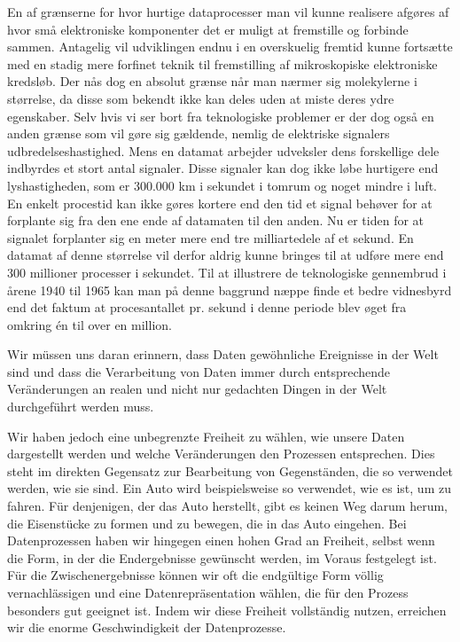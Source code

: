 {En af grænserne for hvor hurtige dataprocesser man vil kunne realisere afgøres af hvor små elektroniske komponenter det er muligt at fremstille og forbinde sammen. Antagelig vil udviklingen endnu i en overskuelig fremtid kunne fortsætte med en stadig mere forfinet teknik til fremstilling af mikroskopiske elektroniske kredsløb. Der nås dog en absolut grænse når man nærmer sig molekylerne i størrelse, da disse som bekendt ikke kan deles uden at miste deres ydre egenskaber. Selv hvis vi ser bort fra teknologiske problemer er der dog også en anden grænse som vil gøre sig gældende, nemlig de elektriske signalers udbredelseshastighed. Mens en datamat arbejder udveksler dens forskellige dele indbyrdes et stort antal signaler. Disse signaler kan dog ikke løbe hurtigere end lyshastigheden, som er 300.000 km i sekundet i tomrum og noget mindre i luft. En enkelt procestid kan ikke gøres kortere end den tid et signal behøver for at forplante sig fra den ene ende af datamaten til den anden. Nu er tiden for at signalet forplanter sig en meter mere end tre milliartedele af et sekund. En datamat af denne størrelse vil derfor aldrig kunne bringes til at udføre mere end 300 millioner processer i sekundet. Til at illustrere de teknologiske gennembrud i årene 1940 til 1965 kan man på denne baggrund næppe finde et bedre vidnesbyrd end det faktum at procesantallet pr. sekund i denne periode blev øget fra omkring én til over en million.
}{
Wir müssen uns daran erinnern, dass Daten gewöhnliche Ereignisse in der Welt sind und dass die Verarbeitung von Daten immer durch entsprechende Veränderungen an realen und nicht nur gedachten Dingen in der Welt durchgeführt werden muss.

Wir haben jedoch eine unbegrenzte Freiheit zu wählen, wie unsere Daten dargestellt werden und welche Veränderungen den Prozessen entsprechen. Dies steht im direkten Gegensatz zur Bearbeitung von Gegenständen, die so verwendet werden, wie sie sind. Ein Auto wird beispielsweise so verwendet, wie es ist, um zu fahren. Für denjenigen, der das Auto herstellt, gibt es keinen Weg darum herum, die Eisenstücke zu formen und zu bewegen, die in das Auto eingehen. Bei Datenprozessen haben wir hingegen einen hohen Grad an Freiheit, selbst wenn die Form, in der die Endergebnisse gewünscht werden, im Voraus festgelegt ist. Für die Zwischenergebnisse können wir oft die endgültige Form völlig vernachlässigen und eine Datenrepräsentation wählen, die für den Prozess besonders gut geeignet ist. Indem wir diese Freiheit vollständig nutzen, erreichen wir die enorme Geschwindigkeit der Datenprozesse.

}

